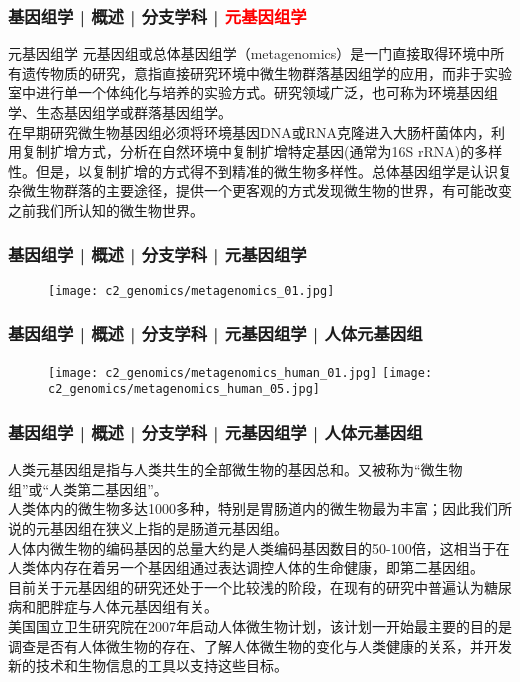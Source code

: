 \begin{frame}
  \frametitle{基因组学 | 概述 | 分支学科 | \textcolor{red}{元基因组学}}
  \begin{block}{元基因组学}
元基因组或总体基因组学（metagenomics）是一门直接取得环境中所有遗传物质的研究，意指直接研究环境中微生物群落基因组学的应用，而非于实验室中进行单一个体纯化与培养的实验方式。研究领域广泛，也可称为环境基因组学、生态基因组学或群落基因组学。\\
\vspace{1em}
在早期研究微生物基因组必须将环境基因DNA或RNA克隆进入大肠杆菌体内，利用复制扩增方式，分析在自然环境中复制扩增特定基因(通常为16S rRNA)的多样性。但是，以复制扩增的方式得不到精准的微生物多样性。总体基因组学是认识复杂微生物群落的主要途径，提供一个更客观的方式发现微生物的世界，有可能改变之前我们所认知的微生物世界。
  \end{block}
\end{frame}

\begin{frame}
  \frametitle{基因组学 | 概述 | 分支学科 | 元基因组学}
  \begin{figure}
    \centering
    \texttt{[image: c2\_genomics/metagenomics\_01.jpg]}
  \end{figure}
\end{frame}

\begin{frame}
  \frametitle{基因组学 | 概述 | 分支学科 | 元基因组学 | 人体元基因组}
  \begin{figure}
    \centering
    \texttt{[image: c2\_genomics/metagenomics\_human\_01.jpg]}
    \quad
    \texttt{[image: c2\_genomics/metagenomics\_human\_05.jpg]}
  \end{figure}
\end{frame}

\begin{frame}
  \frametitle{基因组学 | 概述 | 分支学科 | 元基因组学 | 人体元基因组}
人类元基因组是指与人类共生的全部微生物的基因总和。又被称为“微生物组”或“人类第二基因组”。\\
\vspace{1em}
人类体内的微生物多达1000多种，特别是胃肠道内的微生物最为丰富；因此我们所说的元基因组在狭义上指的是肠道元基因组。\\
\vspace{1em}
人体内微生物的编码基因的总量大约是人类编码基因数目的50-100倍，这相当于在人类体内存在着另一个基因组通过表达调控人体的生命健康，即第二基因组。\\
\vspace{1em}
目前关于元基因组的研究还处于一个比较浅的阶段，在现有的研究中普遍认为糖尿病和肥胖症与人体元基因组有关。\\
\vspace{1em}
美国国立卫生研究院在2007年启动人体微生物计划，该计划一开始最主要的目的是调查是否有人体微生物的存在、了解人体微生物的变化与人类健康的关系，并开发新的技术和生物信息的工具以支持这些目标。
\end{frame}

